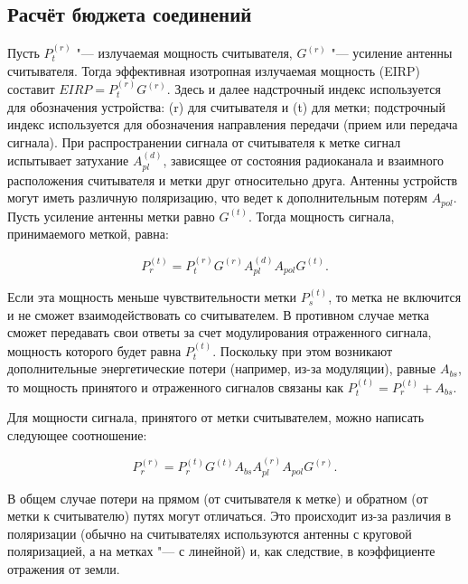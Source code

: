 \subsection{Расчёт бюджета соединений}
Пусть $P_t^{(r)}$ "--- излучаемая мощность считывателя, $G^{(r)}$ "--- усиление антенны считывателя. Тогда эффективная изотропная излучаемая мощность (EIRP) составит $EIRP =  P_t^{(r)} G^{(r)}$. Здесь и далее надстрочный индекс используется для обозначения устройства: (r) для считывателя и (t) для метки; подстрочный индекс используется для обозначения направления передачи (прием или передача сигнала). При распространении сигнала от считывателя к метке сигнал испытывает затухание $A_{pl}^{(d)}$, зависящее от состояния радиоканала и взаимного расположения считывателя и метки друг относительно друга. Антенны устройств могут иметь различную поляризацию, что ведет к дополнительным потерям $A_{pol}$. Пусть усиление антенны метки равно $G^{(t)}$. Тогда мощность сигнала, принимаемого меткой, равна:

$$
	P_r^{(t)} = P_t^{(r)} G^{(r)} A_{pl}^{(d)} A_{pol} G^{(t)}.
$$

Если эта мощность меньше чувствительности метки $P_s^{(t)}$, то метка не включится и не сможет взаимодействовать со считывателем. В противном случае метка сможет передавать свои ответы за счет модулирования отраженного сигнала, мощность которого будет равна $P_t^{(t)}$. Поскольку при этом возникают дополнительные энергетические потери (например, из-за модуляции), равные $A_{bs}$, то мощность принятого и отраженного сигналов связаны как $P_t^{(t)} = P_r^{(t)} + A_{bs}$.

Для мощности сигнала, принятого от метки считывателем, можно написать следующее соотношение:

$$
	P_r^{(r)} = P_r^{(t)} G^{(t)} A_{bs} A_{pl}^{(r)} A_{pol} G^{(r)}.
$$

В общем случае потери на прямом (от считывателя к метке) и обратном (от метки к считывателю) путях могут отличаться. Это происходит из-за различия в поляризации (обычно на считывателях используются антенны с круговой поляризацией, а на метках "--- с линейной) и, как следствие, в коэффициенте отражения от земли.

